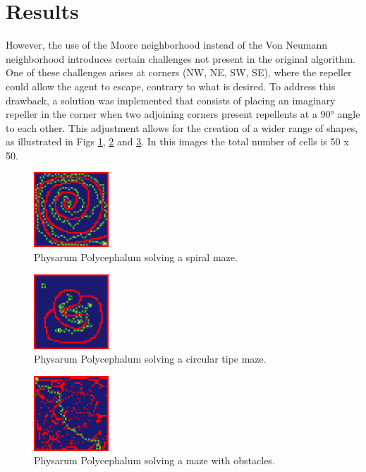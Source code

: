\documentclass[conference]{IEEEtran}
\begin{document}
    \section{Results}
    However, the use of the Moore neighborhood instead of the Von Neumann neighborhood introduces certain challenges not present in the original 
        algorithm. One of these challenges arises at corners (NW, NE, SW, SE), where the repeller could allow the agent to escape, contrary to 
        what is desired. To address this drawback, a solution was implemented that consists of placing an imaginary repeller in the corner when 
        two adjoining corners present repellents at a 90° angle to each other. This adjustment allows for the creation of a wider range of shapes, 
        as illustrated in Figs \ref{fig:physarumCircle1}, 
        \ref{fig:physarumRandom1} and \ref{fig:physarumObstacles1}. In this images the total number of cells is 50 x 50.
    \vskip 0.2cm
    \begin{figure}[htbp]
        \centerline{\includegraphics[width=0.25\textwidth]{./images/Circular1.png}}
        \caption{Physarum Polycephalum solving a spiral maze.} 
        \label{fig:physarumCircle1}    
    \end{figure}
    \begin{figure}[htbp]
        \centerline{\includegraphics[width=0.25\textwidth]{./images/Random1.png}}
        \caption{Physarum Polycephalum solving a circular tipe maze.}
        \label{fig:physarumRandom1}    
    \end{figure}
    \begin{figure}[htbp]
        \centerline{\includegraphics[width=0.25\textwidth]{./images/Obstaculos1.png}}
        \caption{Physarum Polycephalum solving a maze with obstacles.}
        \label{fig:physarumObstacles1}
    \end{figure}
\end{document}
